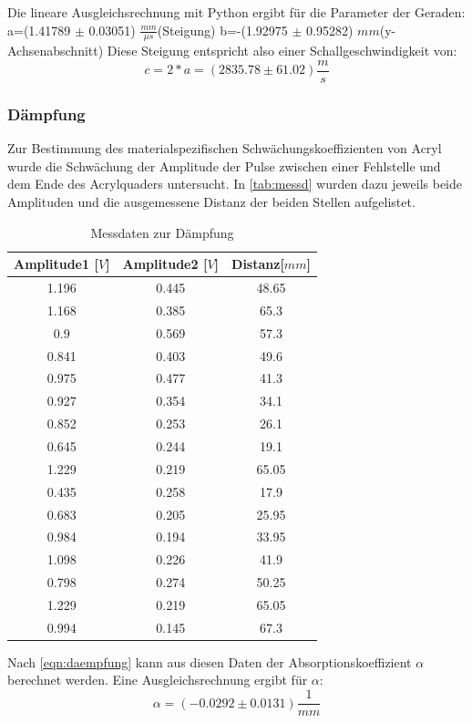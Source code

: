 Die lineare Ausgleichsrechnung mit Python ergibt für die Parameter der Geraden:\newline
a=(1.41789 $\pm$ 0.03051) $\frac{mm}{\mu s}$(Steigung)\newline
b=-(1.92975 $\pm$ 0.95282) $mm$(y-Achsenabschnitt)\newline
Diese Steigung entspricht also einer Schallgeschwindigkeit von:
\begin{equation*}
  c=2*a= (2835.78 \pm 61.02) \frac{m}{s}
\end{equation*} 
\subsubsection{Dämpfung}
Zur Bestimmung des materialspezifischen Schwächungskoeffizienten von Acryl wurde die Schwächung der Amplitude der Pulse zwischen einer Fehlstelle und dem Ende des Acrylquaders untersucht. In \autoref{tab:messd} wurden dazu jeweils beide Amplituden und die ausgemessene Distanz der beiden Stellen aufgelistet.
\begin{table}[H]
  \centering
  \caption{Messdaten zur Dämpfung}
\label{tab:messd}
  \begin{tabular}{c c c}
  \toprule
  Amplitude1 [$V$] & Amplitude2 [$V$] & Distanz[$mm$]\\
  \midrule
1.196& 0.445& 48.65\\
1.168 &0.385 &65.3\\
0.9 &0.569& 57.3\\
0.841& 0.403& 49.6\\
0.975 &0.477 &41.3\\
0.927 &0.354 &34.1\\
0.852 &0.253 &26.1\\
0.645 &0.244 &19.1\\
1.229 &0.219 &65.05\\
0.435 &0.258& 17.9\\
0.683 &0.205 &25.95\\
0.984 &0.194& 33.95\\
1.098 &0.226 &41.9\\
0.798 &0.274& 50.25\\
1.229 &0.219 &65.05\\
0.994& 0.145 &67.3\\
  \bottomrule
  \end{tabular}
\end{table}
Nach \autoref{eqn:daempfung} kann aus diesen Daten der Absorptionskoeffizient $\alpha$ berechnet werden. Eine Ausgleichsrechnung ergibt für $\alpha$:
\begin{equation*}
  \alpha = (-0.0292 \pm 0.0131) \frac{1}{mm}
\end{equation*}

